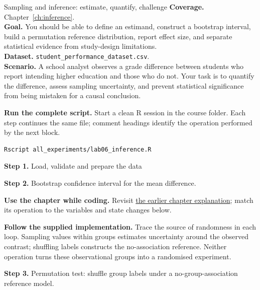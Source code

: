
\begin{labproject}{Sampling and inference: estimate, quantify, challenge}
\textbf{Coverage.} Chapter~\ref{ch:inference}.\\
\textbf{Goal.} You should be able to define an estimand, construct a bootstrap interval, build a permutation reference distribution, report effect size, and separate statistical evidence from study-design limitations.\\
\textbf{Dataset.} \texttt{student\_performance\_dataset.csv}.\\
\textbf{Scenario.} A school analyst observes a grade difference between students who report intending higher education and those who do not. Your task is to quantify the difference, assess sampling uncertainty, and prevent statistical significance from being mistaken for a causal conclusion.



\textbf{Run the complete script.} Start a clean R session in the course folder. Each step continues the same file; comment headings identify the operation performed by the next block.
\begin{lstlisting}[style=utpterminal]
Rscript all_experiments/lab06_inference.R
\end{lstlisting}

\noindent\textbf{Step 1.} Load, validate and prepare the data


\noindent\textbf{Step 2.} Bootstrap confidence interval for the mean difference.



\textbf{Use the chapter while coding.} Revisit \hyperref[ch:inference]{the earlier chapter explanation}; match its operation to the variables and state changes below.

\textbf{Follow the supplied implementation.} Trace the source of randomness in each loop. Sampling values within groups estimates uncertainty around the observed contrast; shuffling labels constructs the no-association reference. Neither operation turns these observational groups into a randomised experiment.




\noindent\textbf{Step 3.} Permutation test: shuffle group labels under a no-group-association reference model.



\end{labproject}
